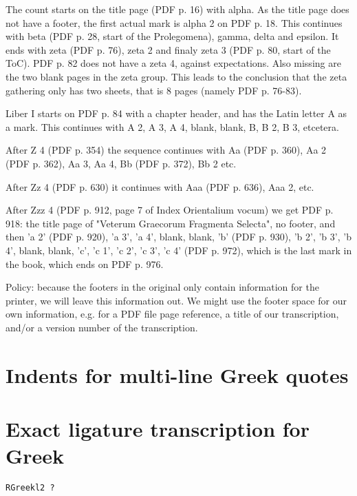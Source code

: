 \documentclass[12pt]{report}
\begin{document}
The count starts on the title page (PDF p. 16) with alpha. As the title page does not have a footer,
the first actual mark is alpha 2 on PDF p. 18.
This continues with
beta (PDF p. 28, start of the Prolegomena), gamma, delta and epsilon.
It ends with zeta (PDF p. 76), zeta 2 and finaly zeta 3 (PDF p. 80, start of the ToC). PDF p. 82 does not have a zeta 4, against expectations. Also missing are the two blank pages in the zeta group. This leads to the conclusion that the zeta gathering only has two sheets, that is 8 pages
(namely PDF p. 76-83).

Liber I starts on PDF p. 84 with a chapter header, and has the Latin letter A as a mark. This continues with A 2, A 3,
A 4, blank, blank, B, B 2, B 3, etcetera.

After Z 4 (PDF p. 354) the sequence continues with Aa (PDF p. 360), Aa 2 (PDF p. 362), Aa 3, Aa 4, Bb (PDF p. 372), Bb 2 etc.

After Zz 4 (PDF p. 630) it continues with Aaa (PDF p. 636), Aaa 2, etc.

After Zzz 4 (PDF p. 912, page 7 of Index Orientalium vocum) we get PDF p. 918: the title page of "Veterum Graecorum Fragmenta Selecta", no footer, and then 'a 2' (PDF p. 920), 'a 3', 'a 4', blank, blank, 'b' (PDF p. 930), 'b 2', 'b 3', 'b 4', blank, blank, 'c', 'c 1', 'c 2', 'c 3', 'c 4' (PDF p. 972), which is the last mark in the book, which ends on PDF p. 976.

Policy: because the footers in the original only contain information for the printer, we will leave this information out.
We might use the footer space for our own information, e.g. for a PDF file page reference, a title of our transcription,
and/or a version number of the transcription.

\section{Indents for multi-line Greek quotes}

\section{Exact ligature transcription for Greek}

\texttt{RGreekl2 ?}
\end{document}
